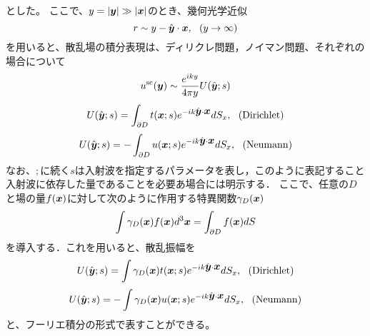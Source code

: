 \documentclass[10pt,a4j,dvipdfmx]{jarticle}
\begin{document}
とした。
ここで、$y=\left|\mbox{\boldmath $y$}\right|\gg \left| \mbox{\boldmath $x$} \right|$のとき、幾何光学近似
\begin{equation}
	r\sim  y  -\hat{\fat{y}}\cdot \fat{x}, \ \ (y\rightarrow \infty)
	\label{eqn:para}
\end{equation}
を用いると、散乱場の積分表現は、ディリクレ問題，ノイマン問題、それぞれの場合について
\begin{equation}
	u^{\rm sc}(\mbox{\boldmath $y$}) \sim \frac{e^{iky}}{4\pi y} U(\hat{\mbox{\boldmath $y$}};s)  
	\label{eqn:}
\end{equation}
\begin{equation}
	U(\hat{\mbox{\boldmath $y$}};s)  = \int _{\partial D} t(\mbox{\boldmath $x$};s)e^{-ik\hat{\mbox{\boldmath $y$}}\cdot \mbox{\boldmath $x$}} dS_x
	, \ \ ( {\rm Dirichlet})
	\label{eqn:}
\end{equation}
\begin{equation}
	U(\hat{\mbox{\boldmath $y$}};s)  =-\int _{\partial D} u(\mbox{\boldmath $x$};s)e^{-ik\hat{\mbox{\boldmath $y$}}\cdot \mbox{\boldmath $x$}} dS_x
	, \ \ ({\rm Neumann})
	\label{eqn:}
\end{equation}
なお、$;$に続く$s$は入射波を指定するパラメータを表し，このように表記すること
入射波に依存した量であることを必要あ場合には明示する．
ここで、任意の$D$と場の量$f(\mbox{\boldmath $x$})$に対して次のように作用する特異関数$\gamma_D(\mbox{\boldmath $x$})$
\begin{equation}
	\int \gamma_D(\mbox{\boldmath $x$})f(\mbox{\boldmath $x$})d^3\mbox{\boldmath $x$} =\int _{\partial D} f(\mbox{\boldmath $x$}) dS
	\label{eqn:}
\end{equation}
を導入する．これを用いると、散乱振幅を
\begin{equation}
	U(\hat{\mbox{\boldmath $y$}};s)  = \int \gamma_D(\mbox{\boldmath $x$})t(\mbox{\boldmath $x$};s)e^{-ik\hat{\mbox{\boldmath $y$}}\cdot \mbox{\boldmath $x$}} dS_x
	, \ \ ( {\rm Dirichlet})
	\label{eqn:}
\end{equation}
\begin{equation}
	U(\hat{\mbox{\boldmath $y$}};s)  =-\int \gamma_D(\mbox{\boldmath $x$})u(\mbox{\boldmath $x$};s)e^{-ik\hat{\mbox{\boldmath $y$}}\cdot \mbox{\boldmath $x$}} dS_x
	, \ \ ({\rm Neumann})
	\label{eqn:}
\end{equation}
と、フーリエ積分の形式で表すことができる。
\end{document}
